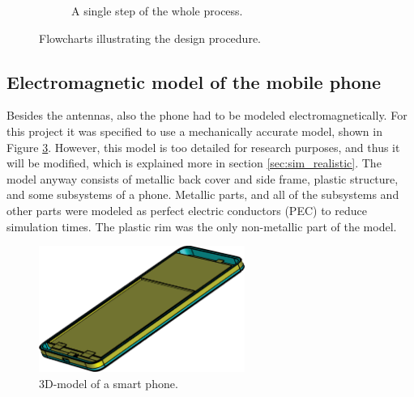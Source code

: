 \begin{figure}[H]
    \centering
    \ContinuedFloat
    \begin{subfigure}[b]{\textwidth}
        \caption{A single step of the whole process.}
        \label{fig:step}
    \end{subfigure}
    \caption{Flowcharts illustrating the design procedure.}
    \label{fig:flowcharts}
\end{figure}


\subsection{Electromagnetic model of the mobile phone}
\label{sec:phone}
Besides the antennas, also the phone had to be modeled electromagnetically. For this project it was specified to use a mechanically accurate model, shown in Figure \ref{fig:cad}. However, this model is too detailed for research purposes, and thus it will be modified, which is explained more in section \ref{sec:sim_realistic}. The model anyway consists of metallic back cover and side frame, plastic structure, and some subsystems of a phone. Metallic parts, and all of the subsystems and other parts were modeled as perfect electric conductors (PEC) to reduce simulation times. The plastic rim was the only non-metallic part of the model.
\begin{figure}[H]
    \centering
    \includegraphics[width=0.6\textwidth]{img/cad.eps}
    \caption{3D-model of a smart phone.}
    \label{fig:cad}
\end{figure}

